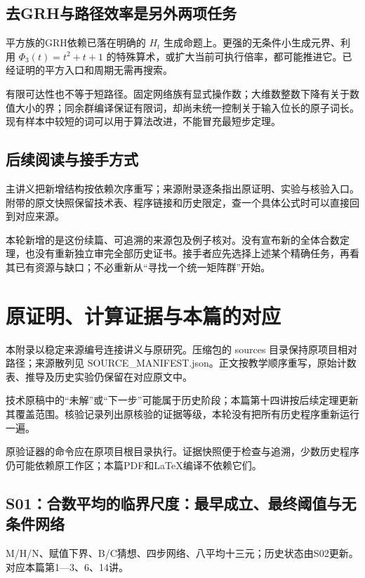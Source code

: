 \documentclass[11pt,a4paper,oneside,openany]{book}
\theoremstyle{definition}\newtheorem{example}[theorem]{例}\newtheorem{conjecture}[theorem]{猜想}
\numberwithin{equation}{chapter}\setcounter{tocdepth}{1}
\newif\iflectureappendix
\let\originalappendix\appendix
\renewcommand{\appendix}{\originalappendix\lectureappendixtrue}
\begin{document}
\section{去GRH与路径效率是另外两项任务}
平方族的GRH依赖已落在明确的 $H_t$ 生成命题上。更强的无条件小生成元界、利用 $\Phi_3(t)=t^2+t+1$ 的特殊算术，或扩大当前可执行倍率，都可能推进它。已经证明的平方入口和周期无需再搜索。

有限可达性也不等于短路径。固定网络族有显式操作数；大维数整数下降有关于数值大小的界；同余群编译保证有限词，却尚未统一控制关于输入位长的原子词长。现有样本中较短的词可以用于算法改进，不能冒充最短步定理。

\section{后续阅读与接手方式}
主讲义把新增结构按依赖次序重写；来源附录逐条指出原证明、实验与核验入口。附带的原文快照保留技术表、程序链接和历史限定，查一个具体公式时可以直接回到对应来源。

本轮新增的是这份续篇、可追溯的来源包及例子核对。没有宣布新的全体合数定理，也没有重新独立审完全部历史证书。接手者应先选择上述某个精确任务，再看其已有资源与缺口；不必重新从“寻找一个统一矩阵群”开始。


\appendix

\chapter{原证明、计算证据与本篇的对应}

本附录以稳定来源编号连接讲义与原研究。压缩包的 sources 目录保持原项目相对路径；来源散列见 SOURCE\_MANIFEST.json。正文按教学顺序重写，原始计数表、推导及历史实验仍保留在对应原文中。

技术原稿中的“未解”或“下一步”可能属于历史阶段；本篇第十四讲按后续定理更新其覆盖范围。核验记录列出原核验的证据等级，本轮没有把所有历史程序重新运行一遍。

原验证器的命令应在原项目根目录执行。证据快照便于检查与追溯，少数历史程序仍可能依赖原工作区；本篇PDF和LaTeX编译不依赖它们。

\section{S01：合数平均的临界尺度：最早成立、最终阈值与无条件网络}\label{source:S01}

M/H/N、赋值下界、B/C猜想、四步网络、八平均十三元；历史状态由S02更新。对应本篇第1—3、6、14讲。

\par{}\par
\end{document}

